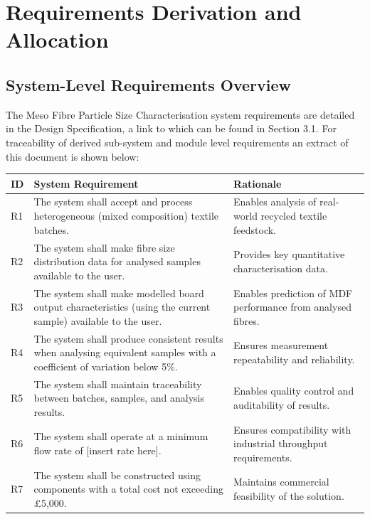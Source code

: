 \documentclass[11pt,a4paper]{article}
\begin{document}
\section{Requirements Derivation and Allocation}

\subsection{System-Level Requirements Overview}

The Meso Fibre Particle Size Characterisation system requirements are detailed in the Design Specification, a link to which can be found in Section 3.1. For traceability of derived sub-system and module level requirements an extract of this document is shown below:

\begin{longtable}{@{}p{1cm}p{7cm}p{7cm}@{}}
\toprule
\textbf{ID} & \textbf{System Requirement} & \textbf{Rationale} \\
\midrule
\endhead

R1 & The system shall accept and process heterogeneous (mixed composition) textile batches.
& Enables analysis of real-world recycled textile feedstock. \\ \midrule

R2 & The system shall make fibre size distribution data for analysed samples available to the user.
& Provides key quantitative characterisation data. \\ \midrule

R3 & The system shall make modelled board output characteristics (using the current sample) available to the user.
& Enables prediction of MDF performance from analysed fibres. \\ \midrule

R4 & The system shall produce consistent results when analysing equivalent samples with a coefficient of variation below 5\%.
& Ensures measurement repeatability and reliability. \\ \midrule

R5 & The system shall maintain traceability between batches, samples, and analysis results.
& Enables quality control and auditability of results. \\ \midrule

R6 & The system shall operate at a minimum flow rate of [insert rate here].
& Ensures compatibility with industrial throughput requirements. \\ \midrule

R7 & The system shall be constructed using components with a total cost not exceeding £5,000.
& Maintains commercial feasibility of the solution. \\

\bottomrule
\end{longtable}
\end{document}
